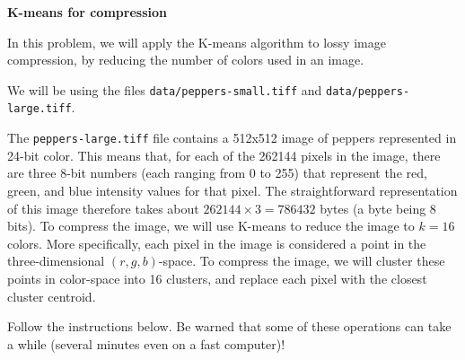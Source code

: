 \clearpage
\item {} {\bf K-means for compression}

In this problem, we will apply the K-means algorithm to lossy image
compression, by reducing the number of colors used in an image.

We will be using the files \texttt{data/peppers-small.tiff} and \texttt{data/peppers-large.tiff}.
	

The \texttt{peppers-large.tiff} file contains
a 512x512 image of peppers represented in 24-bit color. This means
that, for each of the 262144 pixels in the image, there are three
8-bit numbers (each ranging from 0 to 255) that represent the red,
green, and blue intensity values for that pixel. The straightforward
representation of this image therefore takes about $262144 \times 3 =
786432$ bytes (a byte being 8 bits). To compress the image, we will
use K-means to reduce the image to $k = 16$ colors. More specifically,
each pixel in the image is considered a point in the three-dimensional
$(r, g, b)$-space. To compress the image, we will cluster these points
in color-space into 16 clusters, and replace each pixel with the
closest cluster centroid.

Follow the instructions below. Be warned that some of these operations
can take a while (several minutes even on a fast computer)!


\begin{enumerate}

  

  

\end{enumerate}

